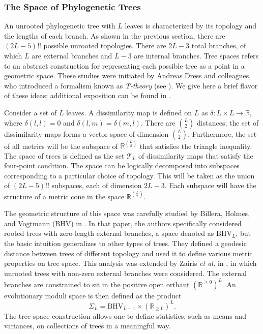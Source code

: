 \subsubsection{The Space of Phylogenetic Trees}
\label{bg:bio:phylo:space}

An unrooted phylogenetic tree with $L$ leaves is characterized by its topology and the lengths of each branch.
As shown in the previous section, there are $(2L-5)!!$ possible unrooted topologies.
There are $2L-3$ total branches, of which $L$ are external branches and $L-3$ are internal branches.
Tree spaces refers to an abstract construction for representing each possible tree as a point in a geometric space.
These studies were initiated by Andreas Dress and colleagues, who introduced a formalism known as \emph{T-theory} (see \cite{Dress:1998vq,Dress:1996di,Dress:1614018}).
We give here a brief flavor of these ideas; additional exposition can be found in \cite[\S 7]{Pachter:2005vo}.

Consider a set of $L$ leaves.
A dissimilarity map is defined on $L$ as $\delta : L \times L \rightarrow \mathbb{R}$, where $\delta(l,l)=0$ and $\delta(l,m)=\delta(m,l)$.
There are $\binom{L}{2}$ distances; the set of dissimilarity maps forms a vector space of dimension $\binom{L}{2}$.
Furthermore, the set of all metrics will be the subspace of $\mathbb{R}^{\binom{L}{2}}$ that satisfies the triangle inequality.
The space of trees is defined as the set $\mathcal{T}_{L}$ of dissimilarity maps that satisfy the four-point condition.
The space can be logically decomposed into subspaces corresponding to a particular choice of topology.
This will be taken as the union of $(2L-5)!!$ subspaces, each of dimension $2L-3$.
Each subspace will have the structure of a metric cone in the space $\mathbb{R}^{\binom{L}{2}}$.

The geometric structure of this space was carefully studied by Billera, Holmes, and Vogtmann (BHV) in \cite{Billera:2001tv}.
In that paper, the authors specifically considered rooted trees with zero-length external branches, a space denoted as $\mathrm{BHV}_{L}$, but the basic intuition generalizes to other types of trees.
They defined a geodesic distance between trees of different topology and used it to define various metric properties on tree space.
This analysis was extended by Zairis \emph{et al.} in \cite{Zairis:2014wa}, in which unrooted trees with non-zero external branches were considered.
The external branches are constrained to sit in the positive open orthant $(\mathbb{R}^{\geq 0})^{L}$.
An evolutionary moduli space is then defined as the product
\begin{equation}
\Sigma_{L} = \mathrm{BHV}_{L-1} \times (\mathbb{R}_{\geq 0})^{L}.
\end{equation}
The tree space construction allows one to define statistics, such as means and variances, on collections of trees in a meaningful way.

